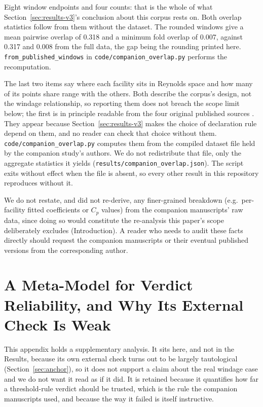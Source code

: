 \documentclass[journal=dce]{CUP-JNL-DTM}%
\begin{document}
\begin{appendix}
Eight window endpoints and four counts: that is the whole of what Section~\ref{sec:results-v3}'s conclusion about this corpus rests on. Both overlap statistics follow from them without the dataset. The rounded windows give a mean pairwise overlap of 0.318 and a minimum fold overlap of 0.007, against 0.317 and 0.008 from the full data, the gap being the rounding printed here. \texttt{from\_published\_windows} in \texttt{code/companion\_overlap.py} performs the recomputation.

The last two items say where each facility sits in Reynolds space and how many of its points share range with the others. Both describe the corpus's design, not the windage relationship, so reporting them does not breach the scope limit below; the first is in principle readable from the four original published sources \citep{guo2024,vrancik1968,liu2024,zheng2024}. They appear because Section~\ref{sec:results-v3} makes the choice of declaration rule depend on them, and no reader can check that choice without them. \texttt{code/companion\_overlap.py} computes them from the compiled dataset file held by the companion study's authors. We do not redistribute that file, only the aggregate statistics it yields (\texttt{results/companion\_overlap.json}). The script exits without effect when the file is absent, so every other result in this repository reproduces without it.

We do not restate, and did not re-derive, any finer-grained breakdown (e.g.\ per-facility fitted coefficients or $C_p$ values) from the companion manuscripts' raw data, since doing so would constitute the re-analysis this paper's scope deliberately excludes (Introduction). A reader who needs to audit these facts directly should request the companion manuscripts or their eventual published versions from the corresponding author.
\section{A Meta-Model for Verdict Reliability, and Why Its External Check Is Weak}
\label{app:metamodel}

This appendix holds a supplementary analysis. It sits here, and not in the Results, because its own external check turns out to be largely tautological (Section~\ref{sec:anchor}), so it does not support a claim about the real windage case and we do not want it read as if it did. It is retained because it quantifies how far a threshold-rule verdict should be trusted, which is the rule the companion manuscripts used, and because the way it failed is itself instructive.


\end{appendix}
\end{document}
